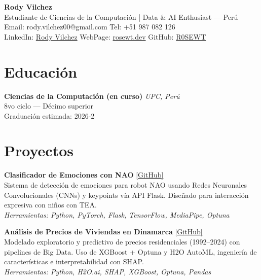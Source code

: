 \documentclass[a4paper,10pt]{article}
\begin{document}
\begin{center}
    \textbf{\Large Rody Vilchez}\\
    \vspace{0.3em}
    \normalsize
    Estudiante de Ciencias de la Computación | Data \& AI Enthusiast — Perú\\
    Email: {rody.vilchez00@gmail.com} \quad
    Tel: +51 987 082 126\\
    LinkedIn: \href{https://www.linkedin.com/in/r0sewt/}{Rody Vilchez} \quad
    WebPage: \href{https://rosewt.dev}{rosewt.dev}
    GitHub: \href{https://github.com/r0sewt}{R0SEWT}


\end{center}

\vspace{1em}

\section*{Educación}
\textbf{Ciencias de la Computación (en curso)} \hfill \textit{UPC, Perú}\\
8vo ciclo — Décimo superior\\
Graduación estimada: 2026-2


\section*{Proyectos}

\textbf{Clasificador de Emociones con NAO} \hfill \href{https://github.com/R0SEWT/nao-cnn-emotion}{[GitHub]}\\
Sistema de detección de emociones para robot NAO usando Redes Neuronales Convolucionales (CNNs) y keypoints vía API Flask. Diseñado para interacción expresiva con niños con TEA.\\
\textit{Herramientas: Python, PyTorch, Flask, TensorFlow, MediaPipe, Optuna}

\vspace{0.7em}

\textbf{Análisis de Precios de Viviendas en Dinamarca} \hfill \href{https://github.com/R0SEWT/Denmark-HousePrices-Analysis}{[GitHub]}\\
Modelado exploratorio y predictivo de precios residenciales (1992–2024) con pipelines de Big Data. Uso de XGBoost + Optuna y H2O AutoML, ingeniería de características e interpretabilidad con SHAP.\\
\textit{Herramientas: Python, H2O.ai, SHAP, XGBoost, Optuna, Pandas}
\end{document}
